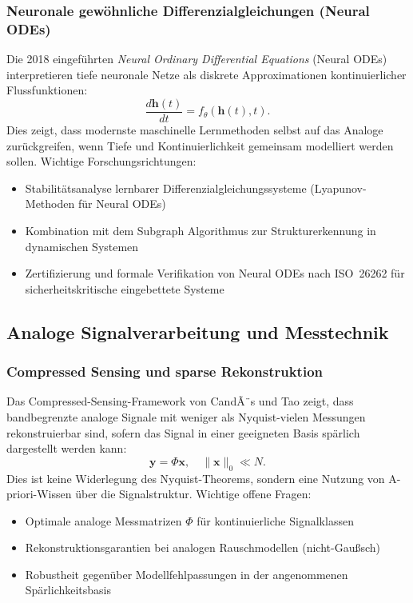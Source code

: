 ﻿\documentclass[a4paper,12pt]{article}
\theoremstyle{definition}
\begin{document}
\subsubsection{Neuronale gewöhnliche Differenzialgleichungen (Neural ODEs)}

Die 2018 eingeführten \emph{Neural Ordinary Differential Equations} (Neural ODEs)
\citep{Chen2018} interpretieren tiefe neuronale Netze als diskrete Approximationen
kontinuierlicher Flussfunktionen:
\[
\frac{d\mathbf{h}(t)}{dt} = f_\theta(\mathbf{h}(t), t).
\]
Dies zeigt, dass modernste maschinelle Lernmethoden selbst auf das Analoge
zurückgreifen, wenn Tiefe und Kontinuierlichkeit gemeinsam modelliert werden sollen.
Wichtige Forschungsrichtungen:
\begin{itemize}
    \item Stabilitätsanalyse lernbarer Differenzialgleichungssysteme
          (Lyapunov-Methoden für Neural ODEs)
    \item Kombination mit dem Subgraph Algorithmus zur Strukturerkennung
          in dynamischen Systemen \citep{Epp2026embedded}
    \item Zertifizierung und formale Verifikation von Neural ODEs nach
          ISO~26262 für sicherheitskritische eingebettete Systeme
\end{itemize}

\subsection{Analoge Signalverarbeitung und Messtechnik}

\subsubsection{Compressed Sensing und sparse Rekonstruktion}

Das Compressed-Sensing-Framework von CandÃ¨s und Tao \citep{Candes2006}
zeigt, dass bandbegrenzte analoge Signale mit weniger als
Nyquist-vielen Messungen rekonstruierbar sind, sofern das Signal in einer
geeigneten Basis spärlich dargestellt werden kann:
\[
\mathbf{y} = \Phi \mathbf{x}, \quad \|\mathbf{x}\|_0 \ll N.
\]
Dies ist keine Widerlegung des Nyquist-Theorems, sondern eine Nutzung von
A-priori-Wissen über die Signalstruktur.  Wichtige offene Fragen:
\begin{itemize}
    \item Optimale analoge Messmatrizen $\Phi$ für kontinuierliche Signalklassen
    \item Rekonstruktionsgarantien bei analogen Rauschmodellen (nicht-Gaußsch)
    \item Robustheit gegenüber Modellfehlpassungen in der angenommenen Spärlichkeitsbasis
\end{itemize}
\end{document}
